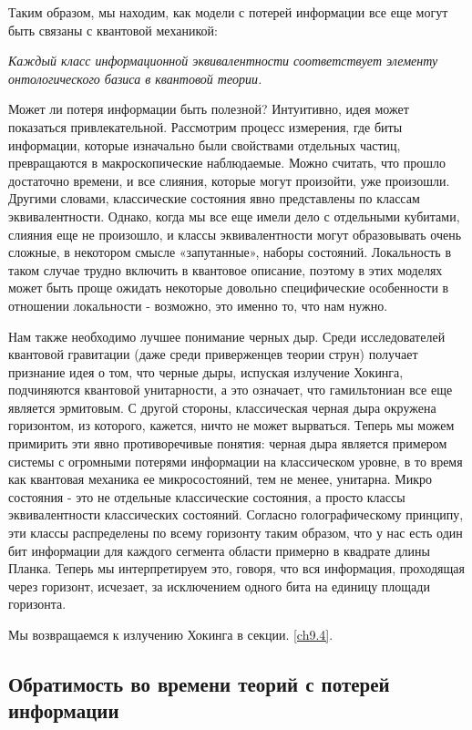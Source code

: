 \documentclass[main.tex]{subfiles}
\begin{document}
Таким образом, мы находим, как модели с потерей информации все еще могут быть связаны с квантовой механикой:

  
\textit{Каждый класс информационной эквивалентности соответствует элементу онтологического базиса в квантовой теории.}
  

Может ли потеря информации быть полезной? Интуитивно, идея может показаться привлекательной. Рассмотрим процесс измерения, где биты информации, которые изначально были свойствами отдельных частиц, превращаются в макроскопические наблюдаемые. Можно считать, что прошло достаточно времени, и все слияния, которые могут произойти, уже произошли. Другими словами, классические состояния явно представлены по классам эквивалентности. Однако, когда мы все еще имели дело с отдельными кубитами, слияния еще не произошло, и классы эквивалентности могут образовывать очень сложные, в некотором смысле «запутанные», наборы состояний. Локальность в таком случае трудно включить в квантовое описание, поэтому в этих моделях может быть проще ожидать некоторые довольно специфические особенности в отношении локальности - возможно, это именно то, что нам нужно.

Нам также необходимо лучшее понимание черных дыр.  Среди исследователей квантовой гравитации (даже среди приверженцев теории струн)  получает признание идея о том, что черные дыры, испуская излучение Хокинга,  подчиняются квантовой унитарности, а это означает, что гамильтониан все еще является эрмитовым. С другой стороны, классическая черная дыра окружена горизонтом, из которого, кажется, ничто не может вырваться. Теперь мы можем примирить эти явно противоречивые понятия: черная дыра является примером системы с огромными потерями информации на классическом уровне, в то время как квантовая механика ее микросостояний, тем не менее, унитарна. Микро состояния - это не отдельные классические состояния, а просто классы эквивалентности классических состояний. Согласно голографическому принципу, эти классы распределены по всему горизонту таким образом, что у нас есть один бит информации для каждого сегмента области примерно в квадрате длины Планка. Теперь мы интерпретируем это, говоря, что вся информация, проходящая через горизонт, исчезает, за исключением одного бита на единицу площади горизонта.

Мы возвращаемся к излучению Хокинга в секции. \ref{ch9.4}.

\subsection{Обратимость во времени теорий с потерей информации}\label{ch7.2}
\end{document}
